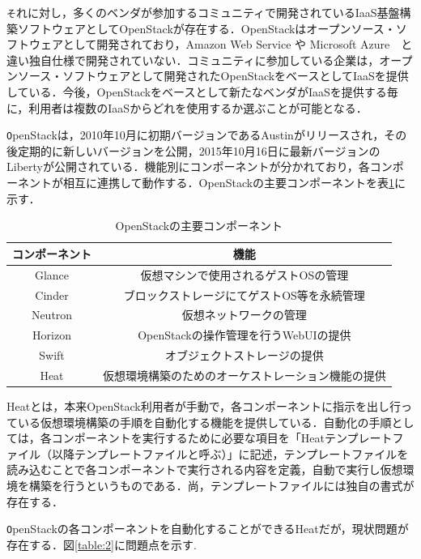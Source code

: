 \documentclass[mingoth]{kut-paper}		%
\begin{document}
	\texttt それに対し，多くのベンダが参加するコミュニティで開発されているIaaS基盤構築ソフトウェアとしてOpenStackが存在する．\cite{bib:3}OpenStackはオープンソース・ソフトウェアとして開発されており，Amazon Web Service や Microsoft Azure　と違い独自仕様で開発されていない．コミュニティに参加している企業は，オープンソース・ソフトウェアとして開発されたOpenStackをベースとしてIaaSを提供している．今後，OpenStackをベースとして新たなベンダがIaaSを提供する毎に，利用者は複数のIaaSからどれを使用するか選ぶことが可能となる．
	
	\texttt OpenStackは，2010年10月に初期バージョンであるAustinがリリースされ，その後定期的に新しいバージョンを公開，2015年10月16日に最新バージョンのLibertyが公開されている．機能別にコンポーネントが分かれており，各コンポーネントが相互に連携して動作する．OpenStackの主要コンポーネントを表\ref{table:1}に示す．
	\begin{table}[H]
		\begin{center}
			\caption{OpenStackの主要コンポーネント}
			\label{table:1}
			\begin{tabular}{|c|c|}\hline
				コンポーネント & 機能\\ \hline \hline
	     		Glance & 仮想マシンで使用されるゲストOSの管理\\ \hline
				Cinder & ブロックストレージにてゲストOS等を永続管理\\ \hline
				Neutron & 仮想ネットワークの管理\\ \hline
				Horizon & OpenStackの操作管理を行うWebUIの提供\\ \hline
				Swift & オブジェクトストレージの提供\\ \hline
				Heat & 仮想環境構築のためのオーケストレーション機能の提供\\ \hline
			\end{tabular}
		\end{center}
	\end{table}
	Heatとは，本来OpenStack利用者が手動で，各コンポーネントに指示を出し行っている仮想環境構築の手順を自動化する機能を提供している．自動化の手順としては，各コンポーネントを実行するために必要な項目を「Heatテンプレートファイル（以降テンプレートファイルと呼ぶ）」に記述，テンプレートファイルを読み込むことで各コンポーネントで実行される内容を定義，自動で実行し仮想環境を構築を行うというものである．尚，テンプレートファイルには独自の書式が存在する．
	
	\texttt OpenStackの各コンポーネントを自動化することができるHeatだが，現状問題が存在する．図\ref{table:2}に問題点を示す.
	
\end{document}
